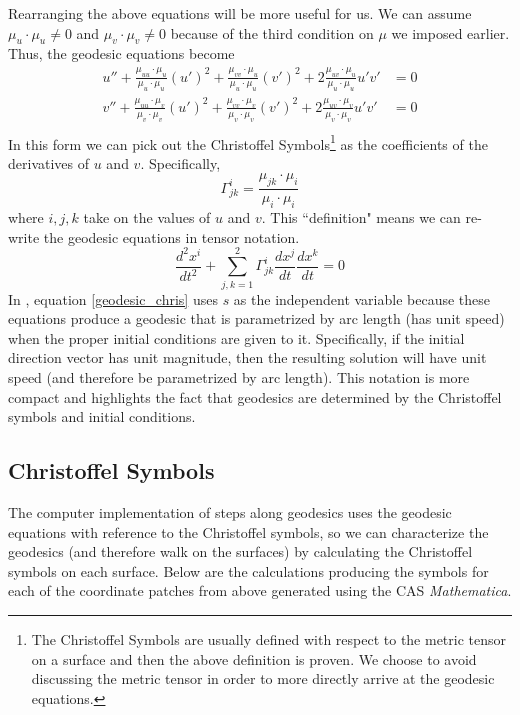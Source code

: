 \documentclass[12pt]{article}
\begin{document}
		Rearranging the above equations will be more useful for us. We can assume $\mu_u \cdot \mu_u \neq 0$  and $\mu_v \cdot \mu_v \neq 0$ because of the third condition on $\mu$ we imposed earlier.
		Thus, the geodesic equations become
		\begin{align*}
			u'' + \frac{\mu_{uu} \cdot \mu_u}{\mu_u \cdot \mu_u} (u')^2 + \frac{\mu_{vv} \cdot \mu_u}{\mu_u \cdot \mu_u} (v')^2 + 2\frac{\mu_{uv} \cdot \mu_u}{\mu_u \cdot \mu_u} u'v' & = 0 \\
			v'' + \frac{\mu_{uu} \cdot \mu_v}{\mu_v \cdot \mu_v} (u')^2 + \frac{\mu_{vv} \cdot \mu_v}{\mu_v \cdot \mu_v} (v')^2 + 2\frac{\mu_{uv} \cdot \mu_v}{\mu_v \cdot \mu_v} u'v' & = 0 \\
		\end{align*}
		In this form we can pick out the Christoffel Symbols\footnote{
			The Christoffel Symbols are usually defined with respect to the metric tensor on a surface and then the above definition is proven.
			We choose to avoid discussing the metric tensor in order to more directly arrive at the geodesic equations.
			}
		as the coefficients of the derivatives of $u$ and $v$. Specifically,
		\begin{equation*}
			\Gamma^i_{jk} = \frac{\mu_{jk} \cdot \mu_i}{\mu_i \cdot \mu_i}
		\end{equation*}
		where $i,j,k$ take on the values of $u$ and $v$.
		This ``definition" means we can re-write the geodesic equations in tensor notation.
		\begin{equation*} \label{geodesic_chris}
			\frac{d^2 x^i}{dt^2} + \sum_{j,k = 1}^2 \Gamma^i_{jk} \frac{d x^j}{dt} \frac{dx^k}{dt} = 0
		\end{equation*}
		In \cite{BanchoffLovett_DiffGeo_2010}, equation \ref{geodesic_chris} uses $s$ as the independent variable because these equations produce a geodesic that is parametrized by arc length (has unit speed) when the proper initial conditions are given to it.
		Specifically, if the initial direction vector has unit magnitude, then the resulting solution will have unit speed (and therefore be parametrized by arc length).
		This notation is more compact and highlights the fact that geodesics are determined by the Christoffel symbols and initial conditions.
		
	\subsection{Christoffel Symbols}
		The computer implementation of steps along geodesics uses the geodesic equations with reference to the Christoffel symbols, so we can characterize the geodesics (and therefore walk on the surfaces) by calculating the Christoffel symbols on each surface.
		Below are the calculations producing the symbols for each of the coordinate patches from above generated using the CAS \textit{Mathematica}.
		
\end{document}
